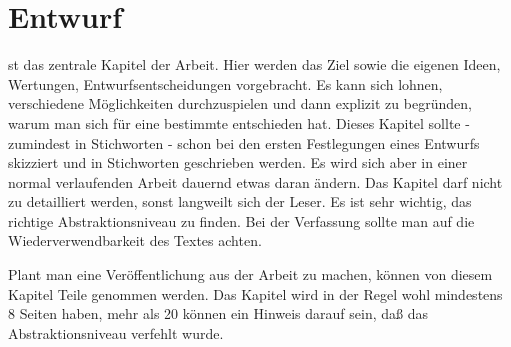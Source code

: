 \chapter{ Entwurf }
st das zentrale Kapitel der Arbeit. Hier werden das Ziel sowie die eigenen Ideen, Wertungen, Entwurfsentscheidungen vorgebracht. Es kann sich lohnen, verschiedene Möglichkeiten durchzuspielen und dann explizit zu begründen, warum man sich für eine bestimmte entschieden hat. Dieses Kapitel sollte - zumindest in Stichworten - schon bei den ersten Festlegungen eines Entwurfs skizziert und in Stichworten geschrieben werden. Es wird sich aber in einer normal verlaufenden Arbeit dauernd etwas daran ändern. Das Kapitel darf nicht zu detailliert werden, sonst langweilt sich der Leser. Es ist sehr wichtig, das richtige Abstraktionsniveau zu finden. Bei der Verfassung sollte man auf die Wiederverwendbarkeit des Textes achten.

Plant man eine Veröffentlichung aus der Arbeit zu machen, können von diesem Kapitel Teile genommen werden. Das Kapitel wird in der Regel wohl mindestens 8 Seiten haben, mehr als 20 können ein Hinweis darauf sein, daß das Abstraktionsniveau verfehlt wurde.
